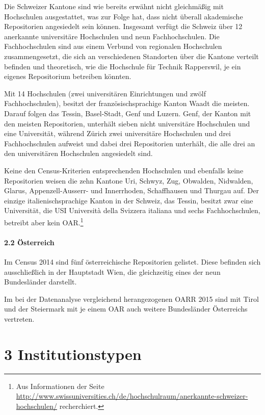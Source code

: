 \documentclass[a4paper,
fontsize=11pt,
oneside,
numbers=noperiodatend,
parskip=half-,
bibliography=totoc,
final
]{scrartcl}
\begin{document}
Die Schweizer Kantone sind wie bereits erwähnt nicht gleichmäßig mit
Hochschulen ausgestattet, was zur Folge hat, dass nicht überall
akademische Repositorien angesiedelt sein können. Insgesamt verfügt die
Schweiz über 12 anerkannte universitäre Hochschulen und neun
Fachhochschulen. Die Fachhochschulen sind aus einem Verbund von
regionalen Hochschulen zusammengesetzt, die sich an verschiedenen
Standorten über die Kantone verteilt befinden und theoretisch, wie die
Hochschule für Technik Rapperswil, je ein eigenes Repositorium betreiben
könnten.

Mit 14 Hochschulen (zwei universitären Einrichtungen und zwölf
Fachhochschulen), besitzt der französischsprachige Kanton Waadt die
meisten. Darauf folgen das Tessin, Basel-Stadt, Genf und Luzern. Genf,
der Kanton mit den meisten Repositorien, unterhält sieben nicht
universitäre Hochschulen und eine Universität, während Zürich zwei
universitäre Hochschulen und drei Fachhochschulen aufweist und dabei
drei Repositorien unterhält, die alle drei an den universitären
Hochschulen angesiedelt sind.

Keine den Census-Kriterien entsprechenden Hochschulen und ebenfalls
keine Repositorien weisen die zehn Kantone Uri, Schwyz, Zug, Obwalden,
Nidwalden, Glarus, Appenzell-Ausserr- und Innerrhoden, Schaffhausen und
Thurgau auf. Der einzige italienischsprachige Kanton in der Schweiz, das
Tessin, besitzt zwar eine Universität, die USI Università della Svizzera
italiana und sechs Fachhochschulen, betreibt aber kein OAR.\footnote{Aus
  Informationen der Seite
  \url{http://www.swissuniversities.ch/de/hochschulraum/anerkannte-schweizer-hochschulen/}
  recherchiert.}

\paragraph{2.2 Österreich}\label{uxf6sterreich}

Im Census 2014 sind fünf österreichische Repositorien gelistet. Diese
befinden sich ausschließlich in der Hauptstadt Wien, die gleichzeitig
eines der neun Bundesländer darstellt.

Im bei der Datenanalyse vergleichend herangezogenen OARR 2015 sind mit
Tirol und der Steiermark mit je einem OAR auch weitere Bundesländer
Österreichs vertreten.

\section*{3 Institutionstypen}\label{institutionstypen}
\end{document}
